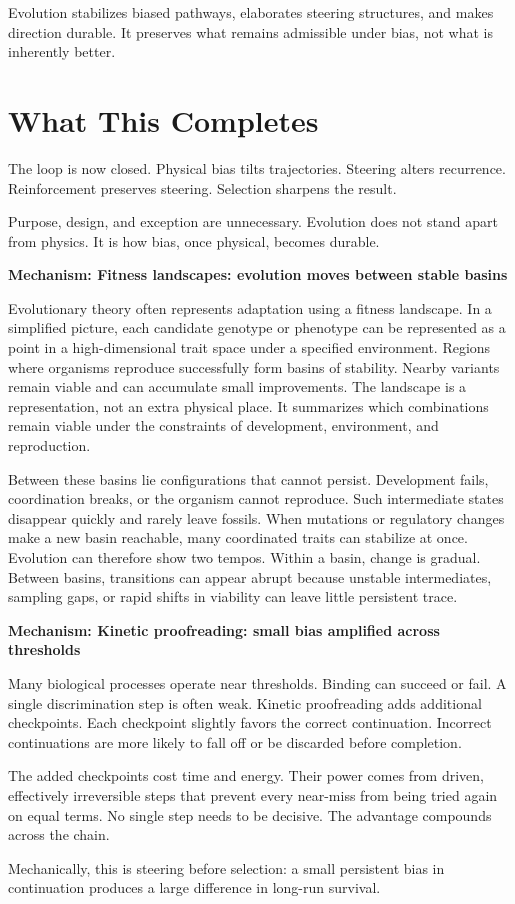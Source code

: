 \documentclass[11pt,twoside,openright]{book}
\newenvironment{mechanismbox}[1]
  {\begin{framed}\noindent\textbf{Mechanism: #1}\par\medskip}
  {\end{framed}}
\begin{document}
Evolution stabilizes biased pathways, elaborates steering structures, and makes direction durable. It preserves what remains admissible under bias, not what is inherently better.

\section*{What This Completes}

The loop is now closed. Physical bias tilts trajectories. Steering alters recurrence. Reinforcement preserves steering. Selection sharpens the result.

Purpose, design, and exception are unnecessary. Evolution does not stand apart from physics. It is how bias, once physical, becomes durable.

\begin{mechanismbox}{Fitness landscapes: evolution moves between stable basins}

Evolutionary theory often represents adaptation using a fitness landscape. In a simplified picture, each candidate genotype or phenotype can be represented as a point in a high-dimensional trait space under a specified environment. Regions where organisms reproduce successfully form basins of stability. Nearby variants remain viable and can accumulate small improvements. The landscape is a representation, not an extra physical place. It summarizes which combinations remain viable under the constraints of development, environment, and reproduction.

Between these basins lie configurations that cannot persist. Development fails, coordination breaks, or the organism cannot reproduce. Such intermediate states disappear quickly and rarely leave fossils. When mutations or regulatory changes make a new basin reachable, many coordinated traits can stabilize at once. Evolution can therefore show two tempos. Within a basin, change is gradual. Between basins, transitions can appear abrupt because unstable intermediates, sampling gaps, or rapid shifts in viability can leave little persistent trace.

\end{mechanismbox}
\begin{mechanismbox}{Kinetic proofreading: small bias amplified across thresholds}

Many biological processes operate near thresholds. Binding can succeed or fail. A single discrimination step is often weak. Kinetic proofreading adds additional checkpoints. Each checkpoint slightly favors the correct continuation. Incorrect continuations are more likely to fall off or be discarded before completion.

The added checkpoints cost time and energy. Their power comes from driven, effectively irreversible steps that prevent every near-miss from being tried again on equal terms. No single step needs to be decisive. The advantage compounds across the chain.

Mechanically, this is steering before selection:
a small persistent bias in continuation
produces a large difference in long-run survival.
\end{mechanismbox}
\end{document}
